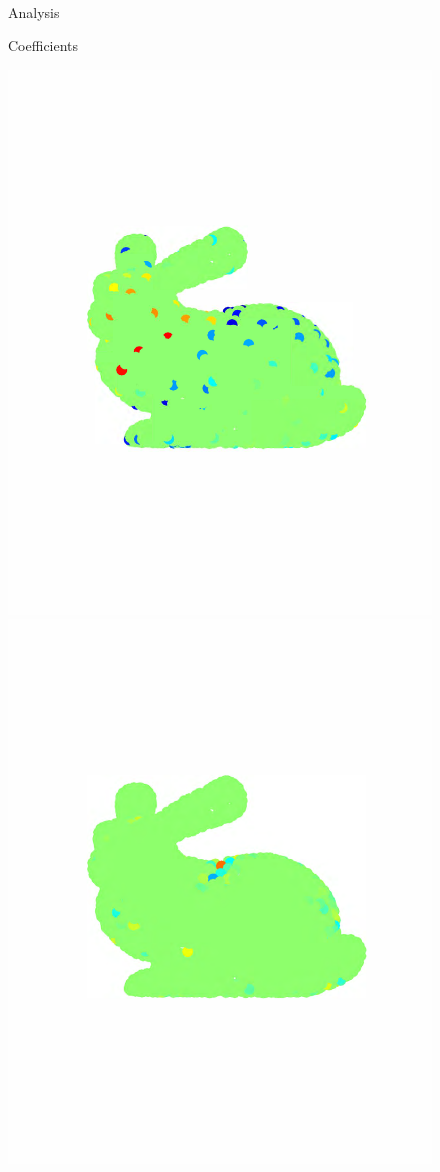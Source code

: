 \documentclass[journal, 10pt]{IEEEtran}
\begin{document}
\begin{figure}[bth]
\begin{minipage}[m]{0.16\linewidth}
\end{minipage}\\
\begin{minipage}[m]{0.16\linewidth}
\centerline{\small{Analysis}}
\centerline{\small{Coefficients}}
\end{minipage}
\begin{minipage}[m]{0.16\linewidth}
\centerline{\includegraphics[width=.8\linewidth]{fig_bunny_coef_scaling}}
\end{minipage}
\begin{minipage}[m]{0.16\linewidth}
\centerline{\includegraphics[width=.8\linewidth]{fig_bunny_coef_wav1}}

\end{minipage}
\end{figure}
\end{document}
